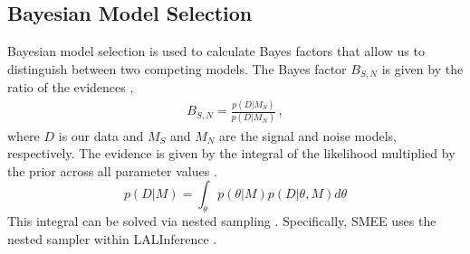 \documentclass[letterpaper, aps, prd, twocolumn, superscriptaddress, showpacs, nofootinbib]{revtex4}
\newcommand{\jade}{\textcolor{red}}
\begin{document}




\subsection{Bayesian Model Selection}
\label{subsec:bayesian}

Bayesian model selection is used to calculate Bayes factors that allow us to distinguish between two competing models. The Bayes factor $B_{S,N}$ is given by the ratio of the evidences \cite{veitch:15},
\begin{align}
B_{S,N} = \frac{p(D|M_{S})}{p(D|M_{N})}\,,
\end{align}
where $D$ is our data and $M_{S}$ and $M_{N}$ are the signal and noise models, respectively. The evidence is given by the integral of the likelihood multiplied by the prior across all parameter values \cite{logue:12, powell:16b}.
\begin{equation}
\label{equ:integral}
p(D|M) = \int_{\theta} p(\theta|M)p(D|\theta,M)d\theta
\end{equation}
This integral can be solved via nested sampling \cite{skilling2004nested}. Specifically, SMEE uses the nested sampler within LALInference \cite{veitch2010bayesian, veitch:15}.
\end{document}
